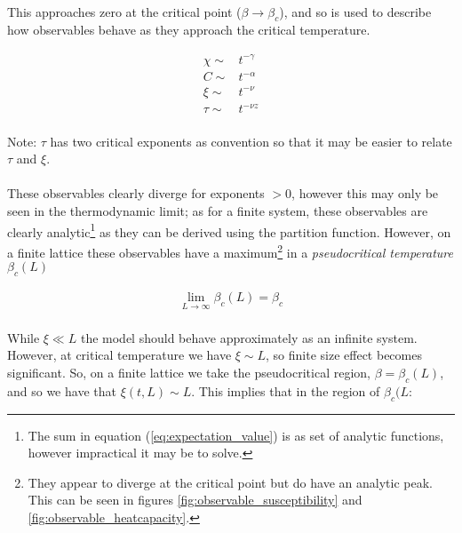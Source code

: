 \documentclass[12pt] {report} %
\begin{document}
				\paragraph{}
					This approaches zero at the critical point ($\beta \rightarrow \beta_c$), and so is used to describe how observables behave as they approach the critical temperature.
					
				\begin{align}
					\chi \sim& t^{-\gamma} \label{eq:exp_chi} \\	
					C \sim& t^{-\alpha}	\label{eq:exp_c}	\\
					\xi \sim& t^{-\nu}	\label{eq:exp_xi} \\
					\tau \sim& t^{-\nu z}	\label{eq:exp_tau}
				\end{align}
				
				\paragraph{}
					Note: $\tau$ has two critical exponents as convention so that it may be easier to relate $\tau$ and $\xi$.
				
				\paragraph{}
					These observables clearly diverge for exponents $> 0$, however this may only be seen in the thermodynamic limit; as for a finite system, these observables are clearly analytic\footnote{The sum in equation (\ref{eq:expectation_value}) is as set of analytic functions, however impractical it may be to solve.} as they can be derived using the partition function. However, on a finite lattice these observables have a maximum\footnote{They appear to diverge at the critical point but do have an analytic peak. This can be seen in figures \ref{fig:observable_susceptibility} and \ref{fig:observable_heatcapacity}.} in a \textit{pseudocritical temperature} $\beta_c(L)$
					
				\begin{align}
					\lim_{L\to\infty} \beta_c(L) = \beta_c	\label{eq:limit_beta_c}
				\end{align}   
				
				\paragraph{}
					While $\xi \ll L$ the model should behave approximately as an infinite system. However, at critical temperature we have $\xi \sim L$, so finite size effect becomes significant. So, on a finite lattice we take the pseudocritical region, $\beta = \beta_c(L)$, and so we have that $\xi(t, L) \sim L$. This implies that in the region of $\beta_c(L$:
					
\end{document}
